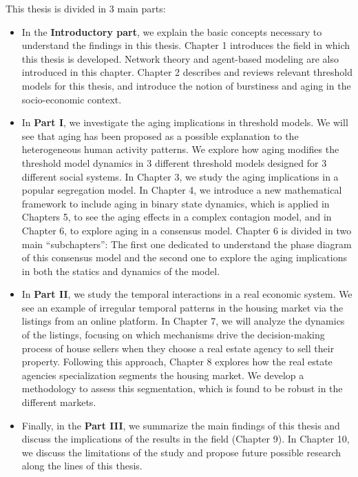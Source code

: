 This thesis is divided in 3 main parts:

\begin{itemize}
    \item In the \textbf{Introductory part}, we explain the basic concepts necessary to understand the findings in this thesis. Chapter 1 introduces the field in which this thesis is developed. Network theory and agent-based modeling are also introduced in this chapter. Chapter 2 describes and reviews relevant threshold models for this thesis, and introduce the notion of burstiness and aging in the socio-economic context. 

    \item In \textbf{Part I}, we investigate the aging implications in threshold models. We will see that aging has been proposed as a possible explanation to the heterogeneous human activity patterns. We explore how aging modifies the threshold model dynamics in 3 different threshold models designed for 3 different social systems. In Chapter 3, we study the aging implications in a popular segregation model. In Chapter 4, we introduce a new mathematical framework to include aging in binary state dynamics, which is applied in Chapters 5, to see the aging effects in a complex contagion model, and in Chapter 6, to explore aging in a consensus model. Chapter 6 is divided in two main ``subchapters'': The first one dedicated to understand the phase diagram of this consensus model and the second one to explore the aging implications in both the statics and dynamics of the model.
    
    \item In \textbf{Part II}, we study the temporal interactions in a real economic system. We see an example of irregular temporal patterns in the housing market via the listings from an online platform. In Chapter 7, we will analyze the dynamics of the listings, focusing on which mechanisms drive the decision-making process of house sellers when they choose a real estate agency to sell their property. Following this approach, Chapter 8 explores how the real estate agencies specialization segments the housing market. We develop a methodology to assess this segmentation, which is found to be robust in the different markets.
    
    \item Finally, in the \textbf{Part III}, we summarize the main findings of this thesis and discuss the implications of the results in the field (Chapter 9). In Chapter 10, we discuss the limitations of the study and propose future possible research along the lines of this thesis.
\end{itemize}